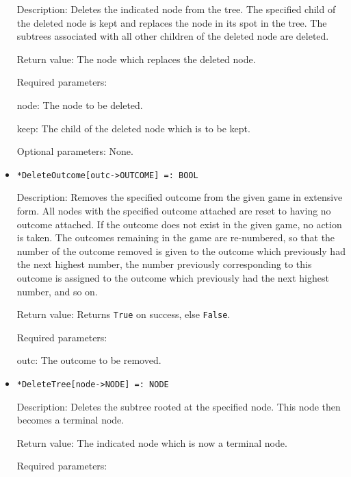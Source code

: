 \begin{itemize}
\bd
\item   
[Description:] Deletes the indicated node from the tree.  The
specified child of the deleted node is kept and replaces the node in
its spot in the tree.  The subtrees associated with all other children
of the deleted node are deleted.
\item
[Return value:] The node which replaces the deleted node.
\item
[Required parameters:]\hfil\null
	
\bd
\item
[node:] The node to be deleted.
\item
[keep:] The child of the deleted node which is to be kept.
\ed

\item
[Optional parameters:] None.
\ed

\item
\protect \large \begin{verbatim}
*DeleteOutcome[outc->OUTCOME] =: BOOL
\end{verbatim}\normalsize

\bd
\item
[Description:] Removes the specified outcome from the given game in
extensive form.  All nodes with the specified outcome attached are
reset to having no outcome attached.  If the outcome does not exist in
the given game, no action is taken.  The outcomes remaining in the
game are re-numbered, so that the number of the outcome removed is
given to the outcome which previously had the next highest number, the
number previously corresponding to this outcome is assigned to the
outcome which previously had the next highest number, and so on.
\item  
[Return value:] Returns \verb+True+ on success, else \verb+False+.  
\item
[Required parameters:]\hfil\null
	
\bd
\item
[outc:] The outcome to be removed.  
\ed
\ed

\item
\protect \large \begin{verbatim}
*DeleteTree[node->NODE] =: NODE
\end{verbatim}\normalsize

\bd
\item
[Description:] Deletes the subtree rooted at the specified node.  This
node then becomes a terminal node.
\item
[Return value:] The indicated node which is now a terminal node.
\item
[Required parameters:]\hfil\null


\end{itemize}
